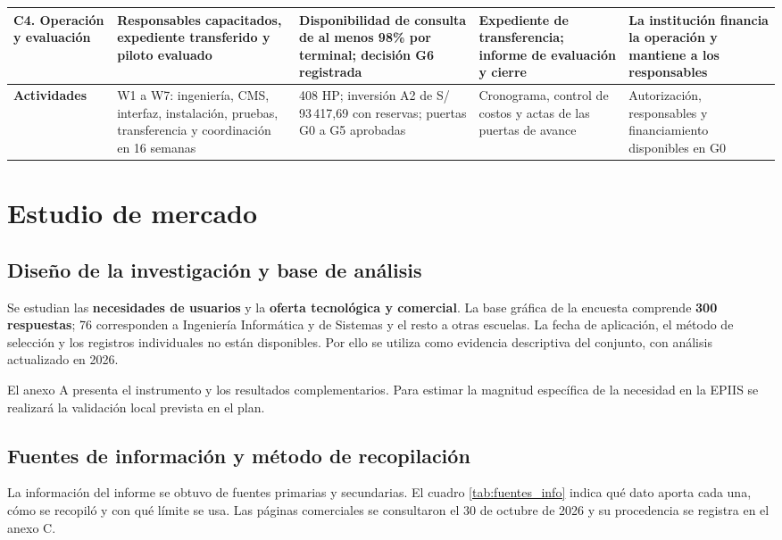\begin{xltabular}{\linewidth}{@{}P{1.95cm}YYYY@{}}
\textbf{C4.} Operación y evaluación & Responsables capacitados, expediente transferido y piloto evaluado & Disponibilidad de consulta de al menos 98\% por terminal; decisión G6 registrada & Expediente de transferencia; informe de evaluación y cierre & La institución financia la operación y mantiene a los responsables\\\midrule
\textbf{Actividades} & W1 a W7: ingeniería, CMS, interfaz, instalación, pruebas, transferencia y coordinación en 16 semanas & 408 HP; inversión A2 de S/ 93\,417,69 con reservas; puertas G0 a G5 aprobadas & Cronograma, control de costos y actas de las puertas de avance & Autorización, responsables y financiamiento disponibles en G0\\
\end{xltabular}\addtocounter{table}{-1}\par\endgroup

\section{Estudio de mercado}\label{sec:mercado}
\subsection{Diseño de la investigación y base de análisis}
Se estudian las \textbf{necesidades de usuarios} y la \textbf{oferta tecnológica y comercial}. La base gráfica de la encuesta comprende \textbf{300 respuestas}; 76 corresponden a Ingeniería Informática y de Sistemas y el resto a otras escuelas. La fecha de aplicación, el método de selección y los registros individuales no están disponibles. Por ello se utiliza como evidencia descriptiva del conjunto, con análisis actualizado en 2026.

El anexo A presenta el instrumento y los resultados complementarios. Para estimar la magnitud específica de la necesidad en la EPIIS se realizará la validación local prevista en el plan.

\subsection{Fuentes de información y método de recopilación}
La información del informe se obtuvo de fuentes primarias y secundarias. El cuadro \ref{tab:fuentes_info} indica qué dato aporta cada una, cómo se recopiló y con qué límite se usa. Las páginas comerciales se consultaron el 30 de octubre de 2026 y su procedencia se registra en el anexo C.

